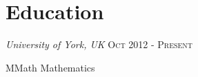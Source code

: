 \documentclass[10pt]{article}
\begin{document}
        \hfill
        \begin{minipage}[t]{0.35\textwidth}
            \vspace{0pt}

            \section{Education}
            {\small {
                \textit{University of York, UK}
                \hfill
                {\raggedleft
                    \textsc{Oct 2012 - Present}
                }
            } \\}
            {\raggedright {
                MMath Mathematics
            } \\}
        \end{minipage}
\end{document}
